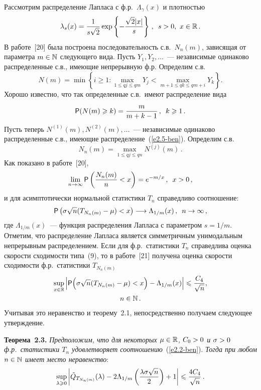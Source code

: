 \begin{multicols}{2}
Рассмотрим распределение Лапласа с ф.р.\ $\Lambda_\gamma(x)$ и
плот\-ностью
$$
\lambda_s(x)=\displaystyle\frac{\displaystyle 1\mathstrut}{\displaystyle s\sqrt 2\mathstrut}\exp\left\{
-\displaystyle\frac{\displaystyle \sqrt{2}|x|\mathstrut}{\displaystyle s\mathstrut} \right\}\,,\enskip s>0,\  x\in\mathbb{R}\,.
$$
В работе~[20] была построена последовательность с.в.\ $N_n(m)$,
зависящая от параметра $m\hm\in\N$ сле\-ду\-юще\-го вида. Пусть $Y_1, Y_2,\ldots$~--- 
независимые одинаково распределенные с.в., имеющие
непрерывную ф.р. Определим с.в.
$$
N(m) = \min\left\{ i\geqslant 1\!: \max\limits_{1\leqslant q j\leqslant 
q m}\! \!Y_j <\max\limits_{m+1\leqslant q k
\leqslant q m+i}\!\! Y_k \right\}.
$$
Хорошо известно, что так определенные с.в.\ имеют распределение вида
\begin{equation}
{\sf P}(N(m) \geqslant  k) = \displaystyle\frac{\displaystyle m\mathstrut}{\displaystyle m+k-1\mathstrut}\,, \enskip k\geqslant  1\,.
\label{e2.5-ben}
\end{equation}
Пусть теперь  $N^{(1)}(m), N^{(2)}(m),\ldots$~--- независимые
одинаково распределенные с.в., имеющие распределение~(\ref{e2.5-ben}).
Определим с.в.
$$
N_n(m)=\max\limits_{1\leqslant q j\leqslant q n}N^{(j)}(m)\,.
$$
Как показано в работе~[20],
\begin{equation*}
\lim\limits_{n\to\infty}{\sf P}\left( \displaystyle\frac{\displaystyle N_n(m)\mathstrut}{\displaystyle n\mathstrut}<x \right) = e^{-m/x}\,,
\enskip x>0\,,
\end{equation*}
и для асимптотически нормальной статистики $T_n$ справедливо
соотношение:
$$
{\sf P}\left(\sigma\sqrt{n}(T_{N_n(m)} - \mu) <
x\right)\longrightarrow \Lambda_{1/m}(x)\,,\enskip n\to\infty\,,
$$
где $\Lambda_{1/m}(x)$~--- функция распределения Лапласа с параметром
$s=1/m$. Отметим, что распределение Лапласа является симметричным
унимодальным непрерывным распределением. Если для ф.р.\ статистики
$T_n$ справедлива оценка скорости сходимости типа~(9), то в работе~[21] 
получена оценка скорости сходимости ф.р.\ статистики
$T_{N_n(m)}$
\begin{multline*}
\sup\limits_{x\in\mathbb{R}}\left\vert {\sf P}\Bigl(\sigma\sqrt n(T_{N_n(m)} - \mu) <
x\Bigr)-\Lambda_{1/m}(x)\right\vert\leqslant  \displaystyle\frac{\displaystyle C_4\mathstrut}{\displaystyle \sqrt n\mathstrut},\\
n\in\mathbb N\,.
\end{multline*}
Учитывая это неравенство и теорему~2.1, непосредственно получаем
следующее утверждение.

\smallskip

\noindent
\textbf{Теорема~2.3.} \textit{Предположим, что для некоторых $\mu\hm\in\r$,
$C_0\hm>0$ и $\sigma\hm>0$ ф.р.\ статистики $T_{n}$ удовлетворяет
соотношению}~(\ref{e2.2-ben}). \textit{Тогда при любом $n\hm\in\N$ имеет место
неравенство}:
$$
\sup\limits_{\lambda\geqslant 0}\left\vert\tilde Q_{T_{N_n(m)}}(\lambda)-
2\Lambda_{1/m}\left(\displaystyle\frac{\displaystyle \lambda\sigma \sqrt{n}\mathstrut}{\displaystyle 2\mathstrut}\right)+1\right\vert\leqslant
\displaystyle\frac{\displaystyle 4C_4\mathstrut}{\displaystyle \sqrt n\mathstrut}\,.
$$


\end{multicols}
